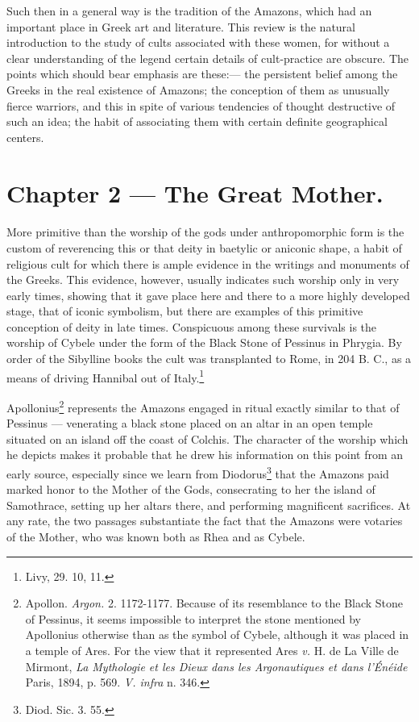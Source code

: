 \documentclass[a4paper, 12pt, oneside]{article}
\begin{document}
Such then in a general way is the tradition of the Amazons, which had an important place in Greek art and literature. This review is the natural introduction to the study of cults associated with these women, for without a clear understanding of the legend certain details of cult-practice are obscure. The points which should bear emphasis are these:--- the persistent belief among the Greeks in the real existence of Amazons; the conception of them as unusually fierce warriors, and this in spite of various tendencies of thought destructive of such an idea; the habit of associating them with certain definite geographical centers.
\clearpage
\section{Chapter 2 --- The Great Mother.}
\paragraph{}
More primitive than the worship of the gods under anthropomorphic form is the custom of reverencing this or that deity in baetylic or aniconic shape, a habit of religious cult for which there is ample evidence in the writings and monuments of the Greeks. This evidence, however, usually indicates such worship only in very early times, showing that it gave place here and there to a more highly developed stage, that of iconic symbolism, but there are examples of this primitive conception of deity in late times. Conspicuous among these survivals is the worship of Cybele under the form of the Black Stone of Pessinus in Phrygia. By order of the Sibylline books the cult was transplanted to Rome, in 204 B. C., as a means of driving Hannibal out of Italy.\footnote{Livy, 29. 10, 11.}

Apollonius\footnote{Apollon. \emph{Argon.} 2. 1172-1177. Because of its resemblance to the Black Stone of Pessinus, it seems impossible to interpret the stone mentioned by Apollonius otherwise than as the symbol of Cybele, although it was placed in a temple of Ares. For the view that it represented Ares \emph{v.} H. de La Ville de Mirmont, \emph{La Mythologie et les Dieux dans les Argonautiques et dans l'Énéide} Paris, 1894, p. 569. \emph{V. infra} n. 346.} represents the Amazons engaged in ritual exactly similar to that of Pessinus --- venerating a black stone placed on an altar in an open temple situated on an island off the coast of Colchis. The character of the worship which he depicts makes it probable that he drew his information on this point from an early source, especially since we learn from Diodorus\footnote{Diod. Sic. 3. 55.} that the Amazons paid marked honor to the Mother of the Gods, consecrating to her the island of Samothrace, setting up her altars there, and performing magnificent sacrifices. At any rate, the two passages substantiate the fact that the Amazons were votaries of the Mother, who was known both as Rhea and as Cybele.
\end{document}
